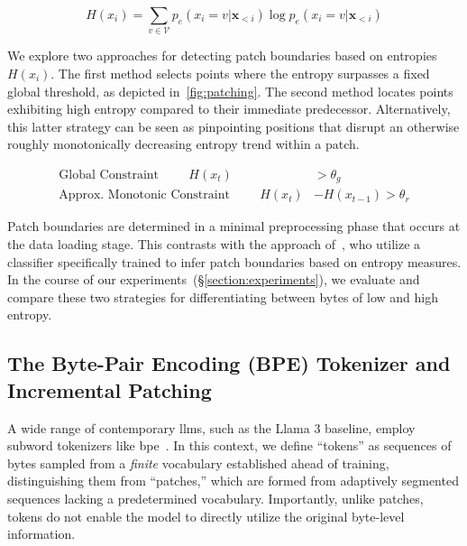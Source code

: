 \begin{equation}
H(x_i) = \sum_{v \in \mathcal{V}} p_{e}(x_i=v|\pmb{x}_{<i}) \log p_{e}(x_i=v|\pmb{x}_{<i})
\end{equation}

We explore two approaches for detecting patch boundaries based on entropies $H(x_i)$. The first method selects points where the entropy surpasses a fixed global threshold, as depicted in~\autoref{fig:patching}. The second method locates points exhibiting high entropy compared to their immediate predecessor. Alternatively, this latter strategy can be seen as pinpointing positions that disrupt an otherwise roughly monotonically decreasing entropy trend within a patch.

\begin{align*}
    \text{Global Constraint}\hspace{1cm}H(x_t)& > \theta_g\\
    \text{Approx. Monotonic Constraint}\hspace{1cm}H(x_t)& - H(x_{t-1}) > \theta_r
\end{align*}

Patch boundaries are determined in a minimal preprocessing phase that occurs at the data loading stage. This contrasts with the approach of~\citet{nawrot-etal-2023-efficient}, who utilize a classifier specifically trained to infer patch boundaries based on entropy measures. In the course of our experiments~(\S\ref{section:experiments}), we evaluate and compare these two strategies for differentiating between bytes of low and high entropy.

\subsection{The Byte-Pair Encoding (BPE) Tokenizer and Incremental Patching}
\label{section:incremental-patching}
\label{section:bpe-patch}

A wide range of contemporary llms, such as the Llama 3 baseline, employ subword tokenizers like bpe~\citep{gage1994new, sennrich-etal-2016-neural}. In this context, we define ``tokens'' as sequences of bytes sampled from a \textit{finite} vocabulary established ahead of training, distinguishing them from ``patches,'' which are formed from adaptively segmented sequences lacking a predetermined vocabulary. Importantly, unlike patches, tokens do not enable the model to directly utilize the original byte-level information.

